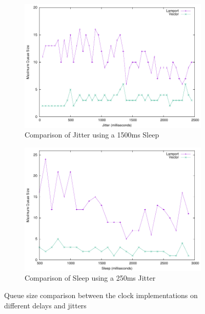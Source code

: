 \documentclass[a4paper, 11pt]{article}
\begin{document}
\begin{figure}[H]
  \begin{center}
    \begin{subfigure}[b]{0.494\textwidth}
      \centering
      \includegraphics[width=\textwidth]{test/jitter.pdf}
      \caption{Comparison of Jitter using a 1500ms Sleep}
      \label{fig:results1}
    \end{subfigure}
    \hfill
    \begin{subfigure}[b]{0.494\textwidth}
      \centering
      \includegraphics[width=\textwidth]{test/sleep.pdf}
      \caption{Comparison of Sleep using a 250ms Jitter}
      \label{fig:results2}
    \end{subfigure}
  \end{center}
  \caption{Queue size comparison between the clock implementations on different delays and jitters}
  \label{fig:comparison}
\end{figure}
\end{document}

